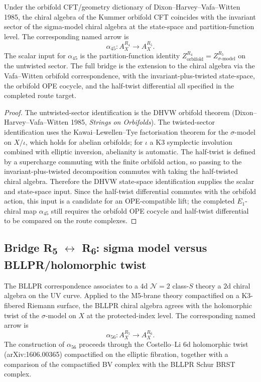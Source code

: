 \begin{proposition}
\label{prop:route4-route5-bridge}
Under the orbifold CFT/geometry dictionary of Dixon--Harvey--Vafa--Witten 1985, the chiral algebra of the Kummer orbifold CFT coincides with the invariant sector of the sigma-model chiral algebra at the state-space and partition-function level. The corresponding named arrow is
\[
 \alpha_{45} \colon A_X^{R_4} \longrightarrow A_X^{R_5}.
\]
The scalar input for $\alpha_{45}$ is the partition-function identity
$Z^{R_4}_{\mathrm{orbifold}} = Z^{R_5}_{\sigma\text{-model}}$ on the
untwisted sector. The full bridge is the extension to the chiral
algebra via the Vafa--Witten orbifold correspondence, with the
invariant-plus-twisted state-space, the orbifold OPE cocycle, and the
half-twist differential all specified in the completed route target.
\end{proposition}

\begin{proof}
The untwisted-sector identification is the DHVW orbifold theorem
(Dixon--Harvey--Vafa--Witten 1985, \emph{Strings on Orbifolds}). The
twisted-sector identification uses the Kawai--Lewellen--Tye
factorisation theorem for the $\sigma$-model on $X/\iota$, which holds
for abelian orbifolds; for \(\iota\) a K3 symplectic involution combined
with elliptic inversion, abelianity is automatic. The half-twist is
defined by a supercharge commuting with the finite orbifold action, so
passing to the invariant-plus-twisted decomposition commutes with taking
the half-twisted chiral algebra. Therefore the DHVW state-space
identification supplies the scalar and state-space input. Since the
half-twist differential commutes with the orbifold action, this input is
a candidate for an OPE-compatible lift; the completed \(E_1\)-chiral map
\(\alpha_{45}\) still requires the orbifold OPE cocycle and half-twist
differential to be compared on the route complexes.
\end{proof}

\subsection{\texorpdfstring{Bridge R\textsubscript{5} $\leftrightarrow$ R\textsubscript{6}: sigma model versus BLLPR/holomorphic twist}{Bridge R5 <-> R6: sigma model versus BLLPR/holomorphic twist}}

\begin{proposition}
\label{prop:route5-route6-bridge}
The BLLPR correspondence associates to a $4$d $\mathcal{N} = 2$ class-$S$ theory a $2$d chiral algebra on the UV curve. Applied to the M5-brane theory compactified on a K3-fibered Riemann surface, the BLLPR chiral algebra agrees with the holomorphic twist of the $\sigma$-model on $X$ at the protected-index level. The corresponding named arrow is
\[
 \alpha_{56} \colon A_X^{R_5} \longrightarrow A_X^{R_6}.
\]
The construction of $\alpha_{56}$ proceeds through the Costello--Li
$6$d holomorphic twist (arXiv:1606.00365) compactified on the elliptic
fibration, together with a comparison of the compactified BV complex
with the BLLPR Schur BRST complex.
\end{proposition}

